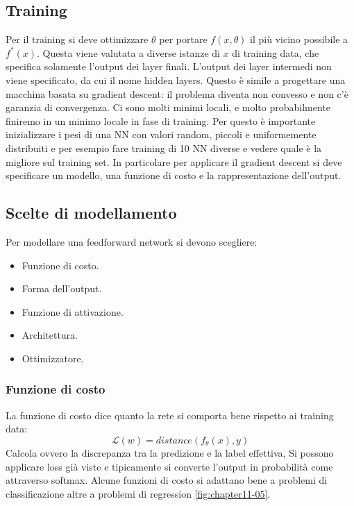 	\subsection{Training}
	Per il training si deve ottimizzare $\theta$ per portare $f(x,\theta)$ il pi\`u vicino possibile a $f^*(x)$.
	Questa viene valutata a diverse istanze di $x$ di training data, che specifica solamente l'output dei layer finali.
	L'output dei layer intermedi non viene specificato, da cui il nome hidden layers.
	Questo \`e simile a progettare una macchina basata su gradient descent: il problema diventa non convesso e non c'\`e garanzia di convergenza. Ci sono molti minimi locali, e molto probabilmente finiremo in un minimo locale in fase di training. Per questo \`e importante inizializzare i pesi di una NN con valori random, piccoli e uniformemente distribuiti e per esempio fare training di 10 NN diverse e vedere quale \`e la migliore sul training set.
	In particolare per applicare il gradient descent si deve specificare un modello, una funzione di costo e la rappresentazione dell'output.

	\subsection{Scelte di modellamento}
	Per modellare una feedforward network si devono scegliere:
	\begin{multicols}{2}
		\begin{itemize}
			\item Funzione di costo.
			\item Forma dell'output.
			\item Funzione di attivazione.
			\item Architettura.
			\item Ottimizzatore.
		\end{itemize}
	\end{multicols}

		\subsubsection{Funzione di costo}
		La funzione di costo dice quanto la rete si comporta bene rispetto ai training data:
		$$\mathcal{L}(w) = distance(f_\theta(x), y)$$
		Calcola ovvero la discrepanza tra la predizione e la label effettiva,
		Si possono applicare loss gi\`a viste e tipicamente si converte l'output in probabilit\`a come attraverso softmax. Alcune funzioni di costo si adattano bene a problemi di classificazione altre a problemi di regression \ref{fig:chapter11-05}.
	
